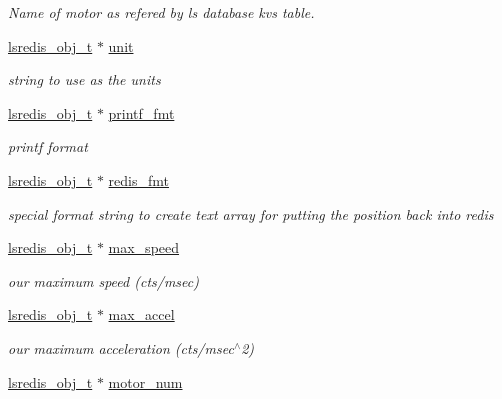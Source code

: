 \begin{DoxyCompactItemize}
\begin{DoxyCompactList}\small\item\em Name of motor as refered by ls database kvs table. \end{DoxyCompactList}\item 
\hyperlink{pgpmac_8h_ad449de06d02791adf2498d2a1e1f909c}{lsredis\-\_\-obj\-\_\-t} $\ast$ \hyperlink{structlspmac__motor__struct_af8e6eb1df6b0d343fc4da93fbdd63133}{unit}
\begin{DoxyCompactList}\small\item\em string to use as the units \end{DoxyCompactList}\item 
\hyperlink{pgpmac_8h_ad449de06d02791adf2498d2a1e1f909c}{lsredis\-\_\-obj\-\_\-t} $\ast$ \hyperlink{structlspmac__motor__struct_a25b13b65baf1b28c34012850809b0a3a}{printf\-\_\-fmt}
\begin{DoxyCompactList}\small\item\em printf format \end{DoxyCompactList}\item 
\hyperlink{pgpmac_8h_ad449de06d02791adf2498d2a1e1f909c}{lsredis\-\_\-obj\-\_\-t} $\ast$ \hyperlink{structlspmac__motor__struct_a91c38b2072d878b71f4e77de2f1375a4}{redis\-\_\-fmt}
\begin{DoxyCompactList}\small\item\em special format string to create text array for putting the position back into redis \end{DoxyCompactList}\item 
\hyperlink{pgpmac_8h_ad449de06d02791adf2498d2a1e1f909c}{lsredis\-\_\-obj\-\_\-t} $\ast$ \hyperlink{structlspmac__motor__struct_a69e49769a1001665377efc7193d88a0a}{max\-\_\-speed}
\begin{DoxyCompactList}\small\item\em our maximum speed (cts/msec) \end{DoxyCompactList}\item 
\hyperlink{pgpmac_8h_ad449de06d02791adf2498d2a1e1f909c}{lsredis\-\_\-obj\-\_\-t} $\ast$ \hyperlink{structlspmac__motor__struct_a50cf4c0711cea164e332bc34705a1a68}{max\-\_\-accel}
\begin{DoxyCompactList}\small\item\em our maximum acceleration (cts/msec$^\wedge$2) \end{DoxyCompactList}\item 
\hyperlink{pgpmac_8h_ad449de06d02791adf2498d2a1e1f909c}{lsredis\-\_\-obj\-\_\-t} $\ast$ \hyperlink{structlspmac__motor__struct_ad6a51cca3c7e5f79168e5c33fd9e736b}{motor\-\_\-num}

\end{DoxyCompactItemize}
